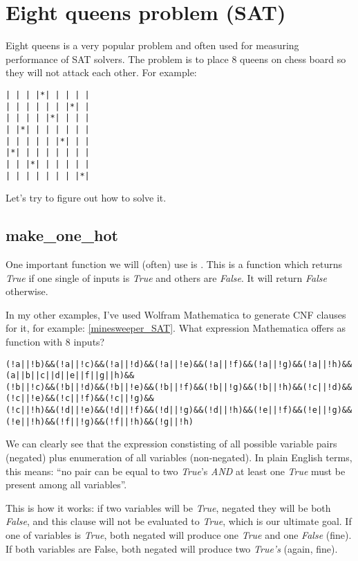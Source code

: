 \section{Eight queens problem (SAT)}
\label{EightQueens}

\renewcommand{\CURPATH}{puzzles/8queens}

Eight queens is a very popular problem and often used for measuring performance of SAT solvers.
The problem is to place 8 queens on chess board so they will not attack each other.
For example:

\begin{lstlisting}
| | | |*| | | | |
| | | | | | |*| |
| | | | |*| | | |
| |*| | | | | | |
| | | | | |*| | |
|*| | | | | | | |
| | |*| | | | | |
| | | | | | | |*|
\end{lstlisting}

Let's try to figure out how to solve it.

\subsection{make\_one\_hot}
\label{POPCNTOne}

One important function we will (often) use is .
This is a function which returns \textit{True} if one single of inputs is \textit{True} and others are \textit{False}.
It will return \textit{False} otherwise.

In my other examples, I've used Wolfram Mathematica to generate CNF clauses for it, for example: \ref{minesweeper_SAT}.
What expression Mathematica offers as  function with 8 inputs?

\begin{lstlisting}
(!a||!b)&&(!a||!c)&&(!a||!d)&&(!a||!e)&&(!a||!f)&&(!a||!g)&&(!a||!h)&&(a||b||c||d||e||f||g||h)&&
(!b||!c)&&(!b||!d)&&(!b||!e)&&(!b||!f)&&(!b||!g)&&(!b||!h)&&(!c||!d)&&(!c||!e)&&(!c||!f)&&(!c||!g)&&
(!c||!h)&&(!d||!e)&&(!d||!f)&&(!d||!g)&&(!d||!h)&&(!e||!f)&&(!e||!g)&&(!e||!h)&&(!f||!g)&&(!f||!h)&&(!g||!h)
\end{lstlisting}

We can clearly see that the expression constisting of all possible variable pairs (negated) plus
enumeration of all variables (non-negated).
In plain English terms, this means: ``no pair can be equal to two \textit{True}'s \textit{AND} at least one \textit{True}
must be present among all variables''.

This is how it works: if two variables will be \textit{True}, negated they will be both \textit{False},
and this clause will not be evaluated
to \textit{True}, which is our ultimate goal.
If one of variables is \textit{True}, both negated will produce one \textit{True} and one \textit{False} (fine).
If both variables are False, both negated will produce two \textit{True's} (again, fine).

